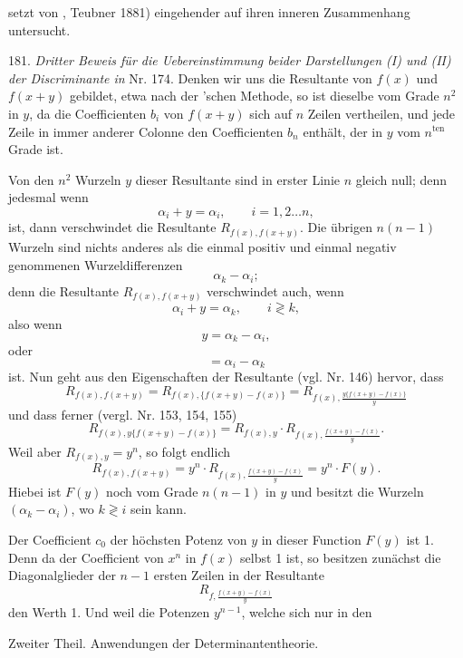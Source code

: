 setzt von , Teubner 1881) eingehender auf ihren inneren Zusammenhang untersucht.

181. \textit{Dritter Beweis für die Uebereinstimmung beider Darstellungen (I) und (II) der Discriminante in} Nr. 174. Denken wir uns
die Resultante von $f(x)$ und $f(x+y)$ gebildet, etwa nach der 'schen Methode, so ist dieselbe vom Grade $n^2$ in $y$, da die Coefficienten $b_i$ von $f(x+y)$ sich auf $n$ Zeilen vertheilen, und jede Zeile
in immer anderer Colonne den Coefficienten $b_n$ enthält, der in $y$ vom
$n^{\text{ten}}$ Grade ist.

Von den $n^2$ Wurzeln $y$ dieser Resultante sind in erster Linie $n$
gleich null; denn jedesmal wenn
\[
\alpha_i + y = \alpha_i, \qquad i = 1, 2 \ldots n,
\]
ist, dann verschwindet die Resultante $R_{f(x),f(x+y)}$. Die übrigen $n(n-1)$
Wurzeln sind nichts anderes als die einmal positiv und einmal negativ
genommenen Wurzeldifferenzen
\[
\alpha_k - \alpha_i;
\]
denn die Resultante $R_{f(x),f(x+y)}$ verschwindet auch, wenn
\[
\alpha_i + y = \alpha_k, \qquad i \gtrless k,
\]
also wenn
\[
y = \alpha_k - \alpha_i,
\]
oder
\[
= \alpha_i - \alpha_k
\]
ist. Nun geht aus den Eigenschaften der Resultante (vgl. Nr. 146)
hervor, dass
\[
R_{f(x),f(x+y)} = R_{f(x),\{f(x+y)-f(x)\}} = R_{f(x), \frac{y\{f(x+y)-f(x)\}}{y}}
\]
und dass ferner (vergl. Nr. 153, 154, 155)
\[
R_{f(x), y\{f(x+y)-f(x)\}} = R_{f(x),y} \cdot R_{f(x), \frac{f(x+y)-f(x)}{y}}.
\]
Weil aber $R_{f(x),y} = y^n$, so folgt endlich
\[
R_{f(x),f(x+y)} = y^n \cdot R_{f(x), \frac{f(x+y)-f(x)}{y}} = y^n \cdot F(y).
\]
Hiebei ist $F(y)$ noch vom Grade $n(n-1)$ in $y$ und besitzt die
Wurzeln $(\alpha_k - \alpha_i)$, wo $k \gtrless i$ sein kann.

Der Coefficient $c_0$ der höchsten Potenz von $y$ in dieser Function $F(y)$
ist 1. Denn da der Coefficient von $x^n$ in $f(x)$ selbst 1 ist, so besitzen
zunächst die Diagonalglieder der $n-1$ ersten Zeilen in der Resultante
\[
R_{f, \frac{f(x+y)-f(x)}{y}}
\]
den Werth 1. Und weil die Potenzen $y^{n-1}$, welche sich nur in den


Zweiter Theil. Anwendungen der Determinantentheorie.

